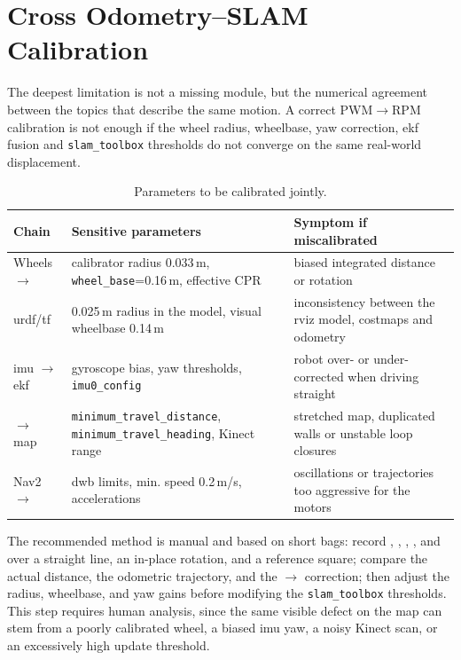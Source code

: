 \section{Cross Odometry--SLAM Calibration}
\label{sec:lim_calibration}

The deepest limitation is not a missing module, but the numerical agreement between the
topics that describe the same motion. A correct PWM$\to$RPM calibration is not enough if
the wheel radius, wheelbase, yaw correction, \gls{ekf} fusion and \texttt{slam\_toolbox}
thresholds do not converge on the same real-world displacement.

\begin{table}[H]
	\centering
	\caption{Parameters to be calibrated jointly.}
	\label{tab:calibration_cross_topics}
	\begin{tabularx}{\linewidth}{L{3.4cm} L{4.3cm} L{4.5cm}}
		\toprule
		\textbf{Chain} & \textbf{Sensitive parameters} & \textbf{Symptom if miscalibrated} \\
		\midrule
		Wheels $\to$  & calibrator radius 0.033\,m, \texttt{wheel\_base}=0.16\,m, effective CPR & biased integrated distance or rotation \\
		\gls{urdf}/\gls{tf} & 0.025\,m radius in the model, visual wheelbase 0.14\,m & inconsistency between the \gls{rviz} model, costmaps and odometry \\
		\gls{imu} $\to$ \gls{ekf} & gyroscope bias, yaw thresholds, \texttt{imu0\_config} & robot over- or under-corrected when driving straight \\
		 $\to$ map & \texttt{minimum\_travel\_distance}, \texttt{minimum\_travel\_heading}, Kinect range & stretched map, duplicated walls or unstable loop closures \\
		Nav2 $\to$  & \gls{dwb} limits, min. speed 0.2\,m/s, accelerations & oscillations or trajectories too aggressive for the motors \\
		\bottomrule
	\end{tabularx}
\end{table}

The recommended method is manual and based on short \ros{} bags: record
, , , , 
and  over a straight line, an in-place rotation, and a reference square;
compare the actual distance, the odometric trajectory, and the
$\to$ correction; then adjust the radius, wheelbase, and yaw gains
before modifying the \texttt{slam\_toolbox} thresholds. This step requires human
analysis, since the same visible defect on the map can stem from a poorly calibrated
wheel, a biased \gls{imu} yaw, a noisy Kinect scan, or an excessively high update
threshold.

